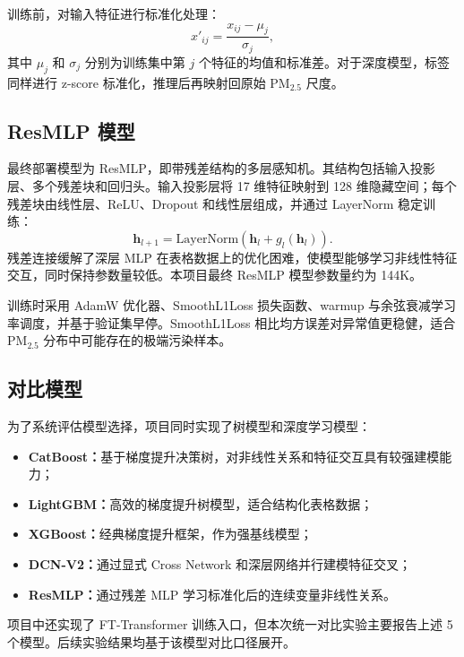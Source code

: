 ﻿\documentclass[UTF8,zihao=-4,a4paper]{ctexart}
\newcommand{\pmfine}{PM$_{2.5}$}
\begin{document}
训练前，对输入特征进行标准化处理：
\begin{equation}
  x'_{ij} = \frac{x_{ij}-\mu_j}{\sigma_j},
  \label{eq:standardize}
\end{equation}
其中 $\mu_j$ 和 $\sigma_j$ 分别为训练集中第 $j$ 个特征的均值和标准差。对于深度模型，标签同样进行 z-score 标准化，推理后再映射回原始 \pmfine{} 尺度。

\subsection{ResMLP 模型}

最终部署模型为 ResMLP，即带残差结构的多层感知机。其结构包括输入投影层、多个残差块和回归头。输入投影层将 17 维特征映射到 128 维隐藏空间；每个残差块由线性层、ReLU、Dropout 和线性层组成，并通过 LayerNorm 稳定训练：
\begin{equation}
  \mathbf{h}_{l+1} = \mathrm{LayerNorm}\left(\mathbf{h}_{l} + g_l(\mathbf{h}_{l})\right).
  \label{eq:resblock}
\end{equation}
残差连接缓解了深层 MLP 在表格数据上的优化困难，使模型能够学习非线性特征交互，同时保持参数量较低。本项目最终 ResMLP 模型参数量约为 144K。

训练时采用 AdamW 优化器、SmoothL1Loss 损失函数、warmup 与余弦衰减学习率调度，并基于验证集早停。SmoothL1Loss 相比均方误差对异常值更稳健，适合 \pmfine{} 分布中可能存在的极端污染样本。

\subsection{对比模型}

为了系统评估模型选择，项目同时实现了树模型和深度学习模型：
\begin{itemize}
  \item \textbf{CatBoost：}基于梯度提升决策树，对非线性关系和特征交互具有较强建模能力；
  \item \textbf{LightGBM：}高效的梯度提升树模型，适合结构化表格数据；
  \item \textbf{XGBoost：}经典梯度提升框架，作为强基线模型；
  \item \textbf{DCN-V2：}通过显式 Cross Network 和深层网络并行建模特征交叉；
  \item \textbf{ResMLP：}通过残差 MLP 学习标准化后的连续变量非线性关系。
\end{itemize}

项目中还实现了 FT-Transformer 训练入口，但本次统一对比实验主要报告上述 5 个模型。后续实验结果均基于该模型对比口径展开。
\end{document}
